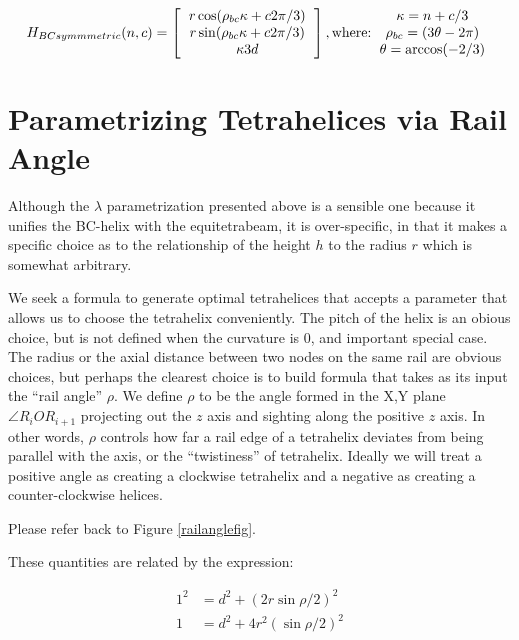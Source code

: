 \documentclass[11pt]{article}
\begin{document}
\[
H_{BCsymmmetric}(n,c) =
\left [
  \begin{tabular}{c}
   $ r  \cos(\rho_{bc} \kappa  + c 2 \pi /3) $\\
   $ r  \sin(\rho_{bc} \kappa  + c 2 \pi /3) $\\
   $ \kappa 3  d $
  \end{tabular}
  \right ],
\text{where:}
  \begin{tabular}{c}
 $\kappa = n + c/3$ \\
    $\rho_{bc} = (3 \theta - 2 \pi)$ \\
   $ \theta = \arccos(-2/3) $
  \end{tabular}      
\]

\section{Parametrizing Tetrahelices via Rail Angle}

Although the $\lambda$ parametrization presented above is a sensible one
because it unifies the BC-helix with the equitetrabeam, it is over-specific,
in that it makes a specific choice as to the relationship of the height $h$
to the radius $r$ which is somewhat arbitrary.

We seek a formula to generate optimal tetrahelices that accepts a
parameter that allows us to choose the tetrahelix conveniently. The
pitch of the helix is an obious choice, but is not defined when the
curvature is $0$, and important special case. The radius or the axial
distance between two nodes on the same rail are obvious choices, but
perhaps the clearest choice is to build formula that takes as its
input the ``rail angle'' $\rho$. We define $\rho$ to be the angle
formed in the X,Y plane $\angle R_i O R_{i+1}$ projecting out the $z$
axis and sighting along the positive $z$ axis. In other words, $\rho$
controls how far a rail edge of a tetrahelix deviates from being
parallel with the axis, or the ``twistiness'' of tetrahelix. Ideally
we will treat a positive angle as creating a clockwise tetrahelix and
a negative as creating a counter-clockwise helices.

Please refer back to Figure \ref{railanglefig}.

 These quantities are related by the expression:

\begin{align*}
  1^2 &= d^2 + (2 r \sin{ \rho / 2})^2 \\
  1 &= d^2 + 4 r^2 (\sin{ \rho / 2})^2 
\end{align*}
\end{document}
